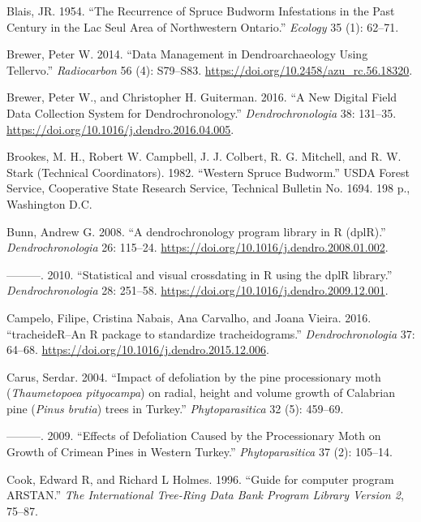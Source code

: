 \documentclass[review]{elsarticle} %
\begin{document}
\leavevmode\hypertarget{ref-Blais1954}{}%
Blais, JR. 1954. ``The Recurrence of Spruce Budworm Infestations in the Past Century in the Lac Seul Area of Northwestern Ontario.'' \emph{Ecology} 35 (1): 62--71.

\leavevmode\hypertarget{ref-Brewer2014}{}%
Brewer, Peter W. 2014. ``Data Management in Dendroarchaeology Using Tellervo.'' \emph{Radiocarbon} 56 (4): S79--S83. \url{https://doi.org/10.2458/azu_rc.56.18320}.

\leavevmode\hypertarget{ref-Brewer2016}{}%
Brewer, Peter W., and Christopher H. Guiterman. 2016. ``A New Digital Field Data Collection System for Dendrochronology.'' \emph{Dendrochronologia} 38: 131--35. \url{https://doi.org/10.1016/j.dendro.2016.04.005}.

\leavevmode\hypertarget{ref-Brookes1987}{}%
Brookes, M. H., Robert W. Campbell, J. J. Colbert, R. G. Mitchell, and R. W. Stark (Technical Coordinators). 1982. ``Western Spruce Budworm.'' USDA Forest Service, Cooperative State Research Service, Technical Bulletin No. 1694. 198 p., Washington D.C.

\leavevmode\hypertarget{ref-Bunn2008}{}%
Bunn, Andrew G. 2008. ``A dendrochronology program library in R (dplR).'' \emph{Dendrochronologia} 26: 115--24. \url{https://doi.org/10.1016/j.dendro.2008.01.002}.

\leavevmode\hypertarget{ref-Bunn2010}{}%
---------. 2010. ``Statistical and visual crossdating in R using the dplR library.'' \emph{Dendrochronologia} 28: 251--58. \url{https://doi.org/10.1016/j.dendro.2009.12.001}.

\leavevmode\hypertarget{ref-Campelo2016}{}%
Campelo, Filipe, Cristina Nabais, Ana Carvalho, and Joana Vieira. 2016. ``tracheideR--An R package to standardize tracheidograms.'' \emph{Dendrochronologia} 37: 64--68. \url{https://doi.org/10.1016/j.dendro.2015.12.006}.

\leavevmode\hypertarget{ref-Carus2004}{}%
Carus, Serdar. 2004. ``Impact of defoliation by the pine processionary moth (\emph{Thaumetopoea pityocampa}) on radial, height and volume growth of Calabrian pine (\emph{Pinus brutia}) trees in Turkey.'' \emph{Phytoparasitica} 32 (5): 459--69.

\leavevmode\hypertarget{ref-Carus2009}{}%
---------. 2009. ``Effects of Defoliation Caused by the Processionary Moth on Growth of Crimean Pines in Western Turkey.'' \emph{Phytoparasitica} 37 (2): 105--14.

\leavevmode\hypertarget{ref-arstan}{}%
Cook, Edward R, and Richard L Holmes. 1996. ``Guide for computer program ARSTAN.'' \emph{The International Tree-Ring Data Bank Program Library Version 2}, 75--87.
\end{document}
